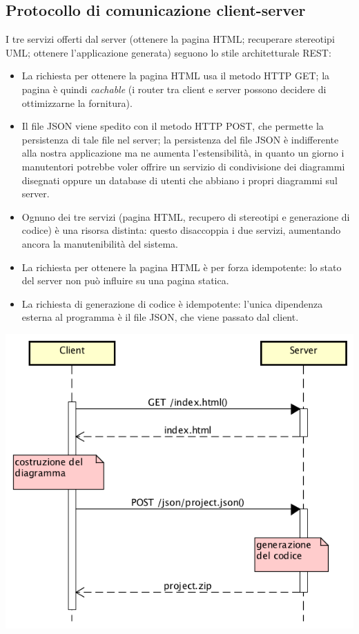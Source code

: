 


\subsection{Protocollo di comunicazione client-server} \label{sec:arch_proto}
I tre servizi offerti dal server (ottenere la pagina HTML; recuperare stereotipi UML; ottenere l'applicazione generata) seguono lo stile architetturale REST:
\begin{itemize}
	\item La richiesta per ottenere la pagina HTML usa il metodo HTTP GET; la pagina è quindi \emph{cachable} (i router tra client e server possono decidere di ottimizzarne la fornitura).
	\item Il file JSON viene spedito con il metodo HTTP POST, che permette la persistenza di tale file nel server; la persistenza del file JSON è indifferente alla nostra applicazione ma ne aumenta l'estensibilità, in quanto un giorno i manutentori potrebbe voler offrire un servizio di condivisione dei diagrammi disegnati oppure un database di utenti che abbiano i propri diagrammi sul server.
	\item Ognuno dei tre servizi (pagina HTML, recupero di stereotipi e generazione di codice) è una risorsa distinta: questo disaccoppia i due servizi, aumentando ancora la manutenibilità del sistema.
	\item La richiesta per ottenere la pagina HTML è per forza idempotente: lo stato del server non può influire su una pagina statica. %
	\item La richiesta di generazione di codice è idempotente: l'unica dipendenza esterna al programma è il file JSON, che viene passato dal client.
\end{itemize}

\begin{center}
	\includegraphics[scale=0.66]{img/http}
\end{center}

